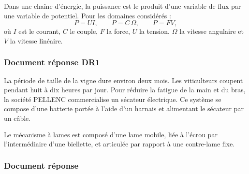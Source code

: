 
Dans une chaîne d'énergie, la puissance est le produit d'une variable de flux
par une variable de potentiel. Pour les domaines considérés :
\[
  P=U I,\qquad P=C\,\Omega,\qquad P=F V,
\]
où $I$ est le courant, $C$ le couple, $F$ la force, $U$ la tension,
$\Omega$ la vitesse angulaire et $V$ la vitesse linéaire.


\subsubsection*{Document réponse DR1}


La période de taille de la vigne dure environ deux mois. Les viticulteurs
coupent pendant huit à dix heures par jour. Pour réduire la fatigue de la main
et du bras, la société PELLENC commercialise un sécateur électrique. Ce système
se compose d'une batterie portée à l'aide d'un harnais et alimentant le sécateur
par un câble.


Le mécanisme à lames est composé d'une lame mobile, liée à l'écrou par
l'intermédiaire d'une biellette, et articulée par rapport à une contre-lame
fixe.



\subsubsection*{Document réponse}


